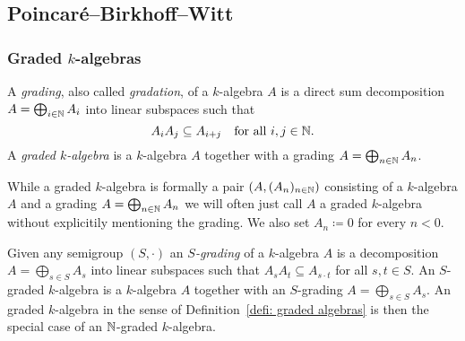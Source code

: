 




\subsection{Poincar\'{e}--Birkhoff--Witt}



\subsubsection{Graded $k$-algebras}


\begin{defi}\label{defi: graded algebras}
 A \emph{grading}, also called \emph{gradation}, of a $k$-algebra $A$ is a direct sum decomposition $A = \bigoplus_{i \in \mathbb{N}} A_i$ into linear subspaces such that
 \[
  A_i A_j \subseteq A_{i+j} \quad \text{for all $i,j \in \mathbb{N}$}.
 \]
 A \emph{graded $k$-algebra} is a $k$-algebra $A$ together with a grading $A = \bigoplus_{n \in \mathbb{N}} A_n$.
\end{defi}


\begin{rem}
 While a graded $k$-algebra is formally a pair $(A, (A_n)_{n \in \mathbb{N}})$ consisting of a $k$-algebra $A$ and a grading $A = \bigoplus_{n \in \mathbb{N}} A_n$ we will often just call $A$ a graded $k$-algebra without explicitily mentioning the grading. We also set $A_n \coloneqq 0$ for every $n < 0$.
\end{rem}


\begin{rem}
 Given any semigroup $(S,\cdot)$ an \emph{$S$-grading} of a $k$-algebra $A$ is a decomposition $A = \bigoplus_{s \in S} A_s$ into linear subspaces such that $A_s A_t \subseteq A_{s \cdot t}$ for all $s,t \in S$. An $S$-graded $k$-algebra is a $k$-algebra $A$ together with an $S$-grading $A = \bigoplus_{s \in S} A_s$. An graded $k$-algebra in the sense of Definition~\ref{defi: graded algebras} is then the special case of an $\mathbb{N}$-graded $k$-algebra.
\end{rem}


